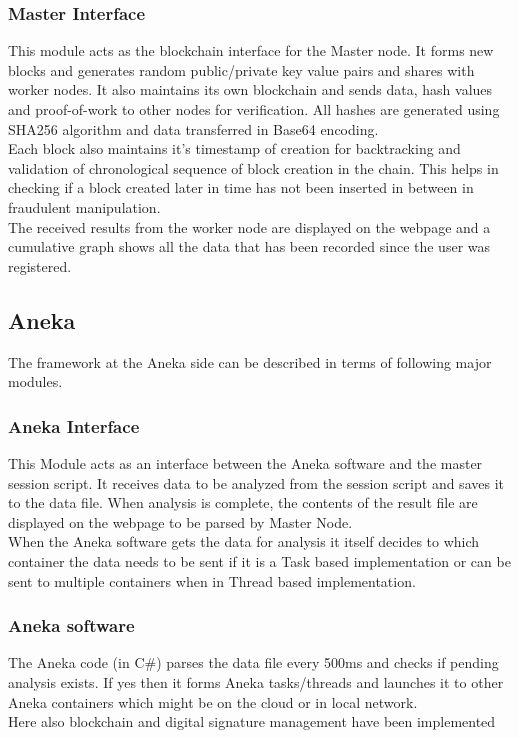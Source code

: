 \documentclass[10pt,journal,compsoc]{IEEEtran}
\begin{document}
\subsubsection{Master Interface}
This module acts as the blockchain interface for the Master node. It forms new blocks and generates random public/private key value pairs and shares with worker nodes. It also maintains its own blockchain and sends data, hash values and proof-of-work to other nodes for verification. All hashes are generated using SHA256 algorithm and data transferred in Base64 encoding.\\ 
Each block also maintains it’s timestamp of creation for backtracking and validation of chronological sequence of block creation in the chain. This helps in checking if a block created later in time has not been inserted in between in fraudulent manipulation. \\
The received results from the worker node are displayed on the webpage and a cumulative graph shows all the data that has been recorded since the user was registered. 

\subsection{Aneka}
The framework at the Aneka side can be described in terms of following major modules.

\subsubsection{Aneka Interface}
This Module acts as an interface between the Aneka software and the master session script. It receives data to be analyzed from the session script and saves it to the data file. When analysis is complete, the contents of the result file are displayed on the webpage to be parsed by Master Node.\\ 
When the Aneka software gets the data for analysis it itself decides to which container the data needs to be sent if it is a Task based implementation or can be sent to multiple containers when in Thread based implementation. 

\subsubsection{Aneka software}
The Aneka code (in C\#) parses the data file every 500ms and checks if pending analysis exists. If yes then it forms Aneka tasks/threads and launches it to other Aneka containers which might be on the cloud or in local network. \\
Here also blockchain and digital signature management have been implemented 
\end{document}
